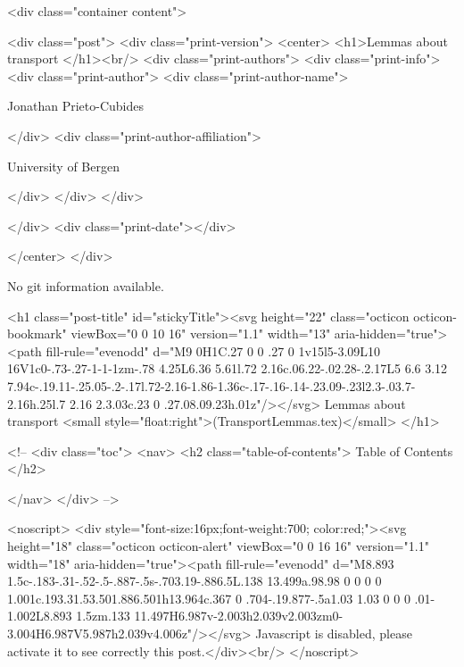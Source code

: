       <div class="container content">
        







<div class="post">
  <div class="print-version">
    <center>
      <h1>Lemmas about transport </h1><br/>
        <div class="print-authors">
          <div class="print-info">
            <div class="print-author">
              <div class="print-author-name">
                
                  Jonathan Prieto-Cubides
                
              </div>
              <div class="print-author-affiliation">
                
                  University of Bergen
                
                </div>
            </div>
          </div>
          
          
        </div>
        <div class="print-date"></div>
        
        
    </center>
  </div>

  
  No git information available.
  

  <h1 class="post-title" id="stickyTitle"><svg height="22" class="octicon octicon-bookmark" viewBox="0 0 10 16" version="1.1" width="13" aria-hidden="true"><path fill-rule="evenodd" d="M9 0H1C.27 0 0 .27 0 1v15l5-3.09L10 16V1c0-.73-.27-1-1-1zm-.78 4.25L6.36 5.61l.72 2.16c.06.22-.02.28-.2.17L5 6.6 3.12 7.94c-.19.11-.25.05-.2-.17l.72-2.16-1.86-1.36c-.17-.16-.14-.23.09-.23l2.3-.03.7-2.16h.25l.7 2.16 2.3.03c.23 0 .27.08.09.23h.01z"/></svg> Lemmas about transport  <small style="float:right">(TransportLemmas.tex)</small>
  </h1>

  <!-- 
  <div class="toc">
    <nav>
    <h2 class="table-of-contents"> Table of Contents </h2>
      

    </nav>
  </div>
   -->

  <noscript>
  <div style="font-size:16px;font-weight:700; color:red;"><svg height="18" class="octicon octicon-alert" viewBox="0 0 16 16" version="1.1" width="18" aria-hidden="true"><path fill-rule="evenodd" d="M8.893 1.5c-.183-.31-.52-.5-.887-.5s-.703.19-.886.5L.138 13.499a.98.98 0 0 0 0 1.001c.193.31.53.501.886.501h13.964c.367 0 .704-.19.877-.5a1.03 1.03 0 0 0 .01-1.002L8.893 1.5zm.133 11.497H6.987v-2.003h2.039v2.003zm0-3.004H6.987V5.987h2.039v4.006z"/></svg> Javascript is disabled, please activate it to see correctly this post.</div><br/>
  </noscript>

